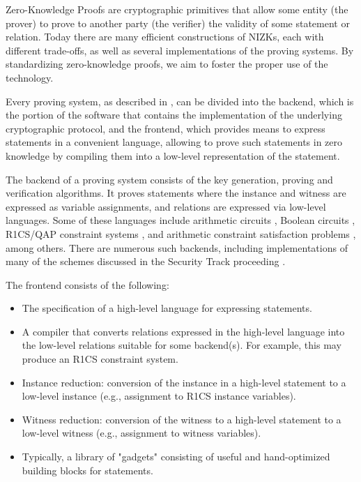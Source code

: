 \documentclass[a4paper,12pt]{article}
\begin{document}
Zero-Knowledge Proofs \cite{GMR85zk} are cryptographic primitives that allow some entity (the prover) to prove to another party (the verifier) the validity of some statement or relation. Today there are many efficient constructions of NIZKs, each with different trade-offs, as well as several implementations of the proving systems. By standardizing zero-knowledge proofs, we aim to foster the proper use of the technology.

Every proving system, as described in \cite{ZKProofImplementation}, can be divided into the backend, which is the portion of the software that contains the implementation of the underlying cryptographic protocol, and the frontend, which provides means to express statements in a convenient language, allowing to prove such statements in zero knowledge by compiling them into a low-level representation of the statement.

The backend of a proving system consists of the key generation, proving and verification algorithms. It proves statements where the instance and witness are expressed as variable assignments, and relations are expressed via low-level languages. Some of these languages include arithmetic circuits \cite{GKR08,wahby2018doubly,cryptoeprint:2018:280,mallersonic}, Boolean circuits \cite{giacomelli2016zkboo,chase2017post,ames2017ligero}, R1CS/QAP constraint systems \cite{GGPR13qsp,PHGR13pinocchio,BCGTV13csnark-eprint,BCTV13von,Groth16size,ben2018aurora, kosba2015c,wu2018dizk,bunz2018bulletproofs}, and arithmetic constraint satisfaction problems \cite{ben2013fast,ben2018scalable}, among others. There are numerous such backends, including implementations of many of the schemes discussed in the Security Track proceeding \cite{ZKProofSecurity}.

The frontend consists of the following:
\begin{itemize}
	\item The specification of a high-level language for expressing statements.
	\item A compiler that converts relations expressed in the high-level language into the low-level relations suitable for some backend(s). For example, this may produce an R1CS constraint system.
	\item Instance reduction: conversion of the instance in a high-level statement to a low-level instance (e.g., assignment to R1CS instance variables).
	\item Witness reduction: conversion of the witness to a high-level statement to a low-level witness (e.g., assignment to witness variables).
	\item Typically, a library of "gadgets" consisting of useful and hand-optimized building blocks for statements.
\end{itemize}
\end{document}
